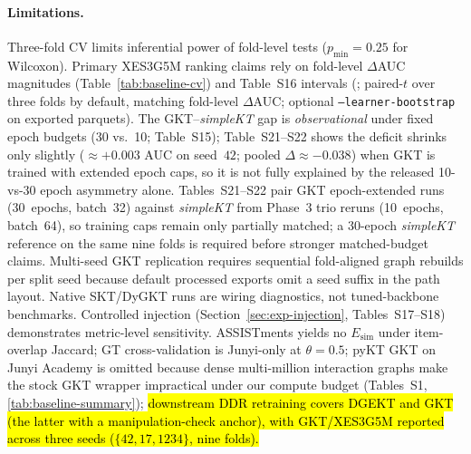 \documentclass[pdflatex,sn-mathphys-num]{sn-jnl}
\newcommand{\Esim}{\ensuremath{E_{\text{sim}}}}
\newcommand{\DDR}{\textsc{DDR}}
\newcommand{\GKTthirtydeltavec}{-0.038}
\newcommand{\GKTepochgain}{+0.003}
\newcommand{\rev}[1]{\hl{#1}}
\newcommand{\rev}[1]{#1}
\begin{document}
\paragraph{Limitations.}
Three-fold CV limits inferential power of fold-level tests ($p_{\min}{=}0.25$ for
Wilcoxon). Primary XES3G5M ranking claims rely on fold-level $\Delta$AUC
magnitudes (Table~\ref{tab:baseline-cv}) and Table~S16 intervals
(; paired-$t$ over three folds by default,
matching fold-level $\Delta$AUC; optional \texttt{--learner-bootstrap} on
exported parquets). The GKT--\textit{simpleKT}
gap is \emph{observational} under fixed epoch budgets (30 vs.\ 10; Table~S15);
Table~S21--S22 shows the deficit shrinks only slightly (${\approx}\GKTepochgain{}$ AUC
on seed~$42$; pooled $\Delta{\approx}\GKTthirtydeltavec{}$) when GKT is trained
with extended epoch caps, so it is not fully explained by the released 10-vs-30
epoch asymmetry alone.
Tables~S21--S22 pair GKT epoch-extended runs (30~epochs, batch~32) against
\textit{simpleKT} from Phase~3 trio reruns (10~epochs, batch~64), so training
caps remain only partially matched; a 30-epoch \textit{simpleKT} reference on
the same nine folds is required before stronger matched-budget claims.
Multi-seed GKT replication requires
sequential fold-aligned graph rebuilds per split seed because default processed
exports omit a seed suffix in the path layout. Native SKT/DyGKT runs
are wiring diagnostics, not tuned-backbone benchmarks. Controlled injection
(Section~\ref{sec:exp-injection}, Tables~S17--S18) demonstrates metric-level
sensitivity. ASSISTments yields no $\Esim$ under item-overlap Jaccard; GT
cross-validation is Junyi-only at $\theta{=}0.5$; pyKT GKT on Junyi Academy
is omitted because dense multi-million interaction graphs make the stock GKT
wrapper impractical under our compute budget (Tables~S1, \ref{tab:baseline-summary});
\rev{downstream \DDR{} retraining covers DGEKT and GKT (the latter with a
manipulation-check anchor), with GKT/XES3G5M reported across three seeds
(\mbox{$\{42,17,1234\}$}, nine folds).}
\end{document}
